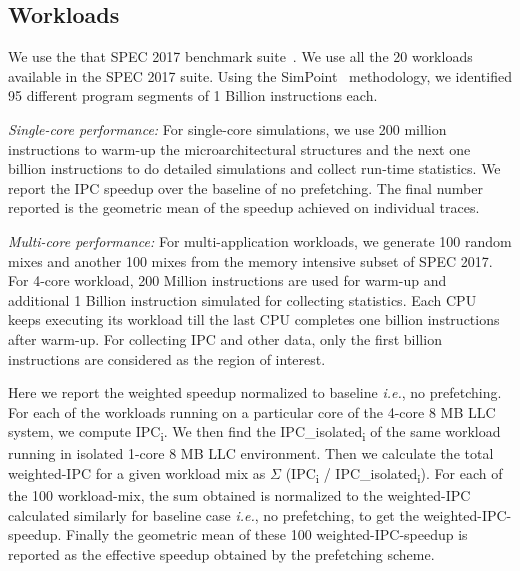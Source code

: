 \subsection{Workloads}
\label{Method-Workloads}

We use the that SPEC 2017 benchmark suite~\cite{SPEC2017}.  We use all the 20
workloads available in the SPEC 2017 suite.  Using the SimPoint~\cite{SimPoint}
methodology, we identified 95 different program segments of 1 Billion
instructions each.

\textit{Single-core performance:} For single-core simulations, we use 200
million instructions to warm-up the microarchitectural structures and the next
one billion instructions to do detailed simulations and collect run-time
statistics. We report the IPC speedup over the baseline of no prefetching.
The final number reported is the geometric mean of the speedup achieved on
individual traces.

\textit{Multi-core performance:} For multi-application workloads, we generate
100 random mixes and another 100 mixes from the memory intensive subset of
SPEC 2017.  For 4-core workload, 200 Million instructions are used for warm-up
and additional 1 Billion instruction simulated for collecting statistics.
Each CPU keeps executing its workload till the last CPU completes one billion
instructions after warm-up.  For collecting IPC and other data, only the first
billion instructions are considered as the region of interest.

Here we report the weighted speedup normalized to baseline
\textit{i.e.}, no prefetching.  For each of the workloads running on a
particular core of the 4-core 8 MB LLC system, we compute
IPC\textsubscript{i}.  We then find the IPC\_isolated\textsubscript{i}
of the same workload running in isolated 1-core 8 MB LLC environment.
Then we calculate the total weighted-IPC for a given workload mix as
$\Sigma$ (IPC\textsubscript{i} / IPC\_isolated\textsubscript{i}).  For
each of the 100 workload-mix, the sum obtained is normalized to the
weighted-IPC calculated similarly for baseline case \textit{i.e.}, no
prefetching, to get the weighted-IPC-speedup.  Finally the geometric
mean of these 100 weighted-IPC-speedup is reported as the effective
speedup obtained by the prefetching scheme.

